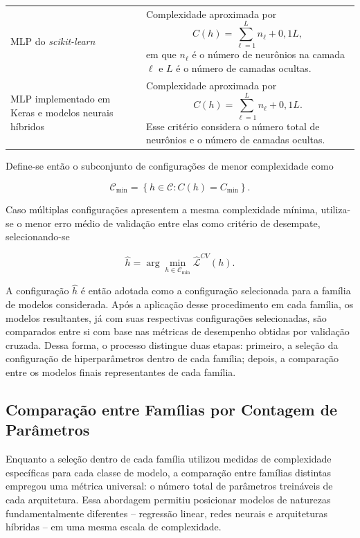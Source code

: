 \begin{longtable}{p{4.2cm} p{9.8cm}}
MLP do \textit{scikit-learn} &
Complexidade aproximada por
\[
C(h)=\sum_{\ell=1}^{L} n_{\ell}+0{,}1L,
\]
em que \(n_{\ell}\) é o número de neurônios na camada \(\ell\) e \(L\) é o número de camadas ocultas. \\

MLP implementado em Keras e modelos neurais híbridos &
Complexidade aproximada por
\[
C(h)=\sum_{\ell=1}^{L} n_{\ell}+0{,}1L.
\]
Esse critério considera o número total de neurônios e o número de camadas ocultas. \\

\end{longtable}

Define-se então o subconjunto de configurações de menor complexidade como

\begin{equation}
\mathcal{C}_{\min}=
\left\{
h\in\mathcal{C}:
C(h)=C_{\min}
\right\}.
\label{eq:conjunto_complexidade_minima_configuracao}
\end{equation}

Caso múltiplas configurações apresentem a mesma complexidade mínima, utiliza-se o menor erro médio de validação entre elas como critério de desempate, selecionando-se

\begin{equation}
\widehat{h}=
\arg\min_{h\in\mathcal{C}_{\min}}
\widehat{\mathcal{L}}^{CV}(h).
\label{eq:configuracao_final_empate}
\end{equation}

A configuração \(\widehat{h}\) é então adotada como a configuração selecionada para a família de modelos considerada. Após a aplicação desse procedimento em cada família, os modelos resultantes, já com suas respectivas configurações selecionadas, são comparados entre si com base nas métricas de desempenho obtidas por validação cruzada. Dessa forma, o processo distingue duas etapas: primeiro, a seleção da configuração de hiperparâmetros dentro de cada família; depois, a comparação entre os modelos finais representantes de cada família.

\subsection{Comparação entre Famílias por Contagem de Parâmetros}

Enquanto a seleção dentro de cada família utilizou medidas de complexidade específicas para cada classe de modelo, a comparação entre famílias distintas empregou uma métrica universal: o número total de parâmetros treináveis de cada arquitetura. Essa abordagem permitiu posicionar modelos de naturezas fundamentalmente diferentes -- regressão linear, redes neurais e arquiteturas híbridas -- em uma mesma escala de complexidade.


